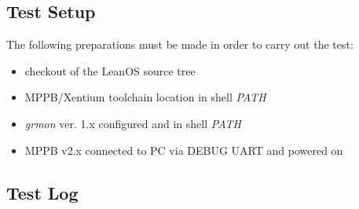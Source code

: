 \subsection*{Test Setup}

The following preparations must be made in order to carry out the test:

\begin{itemize}
	\item checkout of the LeanOS source tree
	\item \gls{MPPB}/\gls{Xentium} toolchain location in shell \emph{PATH}
	\item \emph{grmon} ver. 1.x configured and in shell \emph{PATH}
	\item \gls{MPPB} v2.x connected to PC via DEBUG UART and powered on
\end{itemize}


\subsection*{Test Log}




